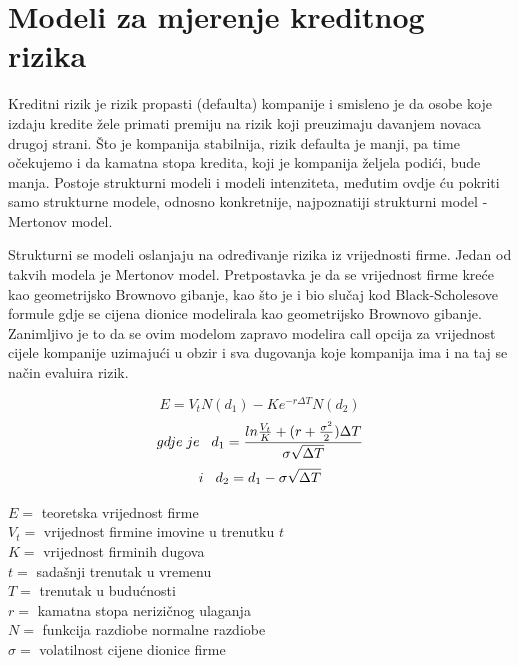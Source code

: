 \documentclass[times, utf8, seminar]{fer}
\begin{document}
\chapter{Modeli za mjerenje kreditnog rizika}
Kreditni rizik je rizik propasti (defaulta) kompanije i smisleno je da osobe koje izdaju kredite žele primati premiju na rizik koji preuzimaju davanjem novaca drugoj strani. Što je kompanija stabilnija, rizik defaulta je manji, pa time očekujemo i da kamatna stopa kredita, koji je kompanija željela podići, bude manja. Postoje strukturni modeli i modeli intenziteta, međutim ovdje ću pokriti samo strukturne modele, odnosno konkretnije, najpoznatiji strukturni model - Mertonov model.

Strukturni se modeli oslanjaju na određivanje rizika iz vrijednosti firme. Jedan od takvih modela je Mertonov model. Pretpostavka je da se vrijednost firme kreće kao geometrijsko Brownovo gibanje, kao što je i bio slučaj kod Black-Scholesove formule gdje se cijena dionice modelirala kao geometrijsko Brownovo gibanje.
Zanimljivo je to da se ovim modelom zapravo modelira call opcija za vrijednost cijele kompanije uzimajući u obzir i sva dugovanja koje kompanija ima i na taj se način evaluira rizik.

\[ E = V_tN(d_1) - K e^{-r\Delta T}N(d_2)\]
\[ gdje \hspace{0.1cm} je \hspace{0.3cm} d_1 = \frac{ln \frac{V_t}{K} + (r+\frac{\sigma^2}{2})\Delta T}{\sigma\sqrt{\Delta T}} \]
\[ i \hspace{0.3cm} d_2 = d_1 - \sigma\sqrt{\Delta T}\]

\noindent $E =$ teoretska vrijednost firme \\
$V_t =$ vrijednost firmine imovine u trenutku $t$\\
$K =$ vrijednost firminih dugova\\
$t =$ sadašnji trenutak u vremenu\\
$T =$ trenutak u budućnosti\\
$r =$ kamatna stopa nerizičnog ulaganja\\
$N =$ funkcija razdiobe normalne razdiobe\\
$\sigma =$ volatilnost cijene dionice firme\\

\end{document}
